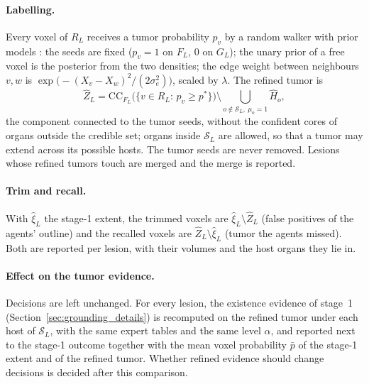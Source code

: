 \documentclass[fleqn,10pt]{olplainarticle}
\begin{document}
\paragraph{Labelling.} Every voxel of $R_L$ receives a tumor probability $p_v$ by a random walker with prior models
\cite{grady2005multilabel}: the seeds are fixed ($p_v=1$ on $F_L$, $0$ on $G_L$); the unary prior of a free voxel is the
posterior from the two densities; the edge weight between neighbours $v,w$ is
$\exp\bigl(-(X_v-X_w)^2/(2\sigma_e^2)\bigr)$, scaled by $\lambda$. The refined tumor is
\begin{equation}
\label{eq:refined}
\hat Z_L=\mathrm{CC}_{F_L}\bigl(\{v\in R_L:\,p_v\ge p^\ast\}\bigr)\setminus\bigcup_{o\notin\mathcal{S}_L,\ \mu_o=1}\hat H_o ,
\end{equation}
the component connected to the tumor seeds, without the confident cores of organs outside the credible set; organs inside
$\mathcal{S}_L$ are allowed, so that a tumor may extend across its possible hosts. The tumor seeds are never removed.
Lesions whose refined tumors touch are merged and the merge is reported.

\paragraph{Trim and recall.} With $\hat\xi_L$ the stage-1 extent, the trimmed voxels are $\hat\xi_L\setminus\hat Z_L$
(false positives of the agents' outline) and the recalled voxels are $\hat Z_L\setminus\hat\xi_L$ (tumor the agents
missed). Both are reported per lesion, with their volumes and the host organs they lie in.

\paragraph{Effect on the tumor evidence.} Decisions are left unchanged. For every lesion, the existence evidence of stage~1
(Section~\ref{sec:grounding_details}) is recomputed on the refined tumor under each host of $\mathcal{S}_L$, with the same
expert tables and the same level $\alpha$, and reported next to the stage-1 outcome together with the mean voxel
probability $\bar p$ of the stage-1 extent and of the refined tumor. Whether refined evidence should change decisions is
decided after this comparison.
\end{document}
